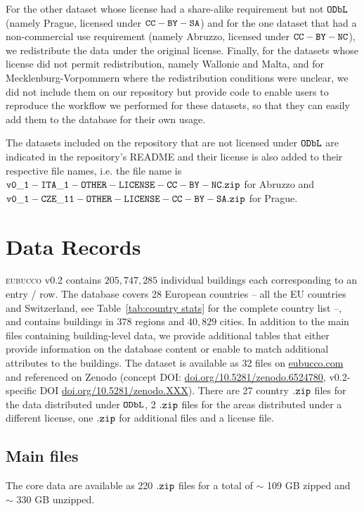 \documentclass[fleqn,10pt]{wlscirep}
\begin{document}
For the other dataset whose license had a share-alike requirement but not ${\tt ODbL}$ (namely Prague, licensed under ${\tt CC-BY-SA}$) and for the one dataset that had a non-commercial use requirement (namely Abruzzo, licensed under ${\tt CC-BY-NC}$), we redistribute the data under the original license. Finally, for the datasets whose license did not permit redistribution, namely Wallonie and Malta, and for Mecklenburg-Vorpommern where the redistribution conditions were unclear, we did not include them on our repository but provide code to enable users to reproduce the workflow we performed for these datasets, so that they can easily add them to the database for their own usage. 

The datasets included on the repository that are not licensed under ${\tt ODbL}$ are indicated in the repository's README and their license is also added to their respective file names, i.e. the file name is ${\tt v0\_1-ITA\_1-OTHER-LICENSE-CC-BY-NC.zip}$ for Abruzzo and ${\tt v0\_1-CZE\_11-OTHER-LICENSE-CC-BY-SA.zip}$ for Prague.


\section*{Data Records}

\textsc{eubucco} v0.2 \cite{eubucco_v0.2_2022_dataset} contains $205, 747, 285$ individual buildings each corresponding to an entry / row. The database covers 28 European countries -- all the EU countries and Switzerland, see Table~\ref{tab:country stats} for the complete country list --, and contains buildings in 378 regions and $40,829$ cities. In addition to the main files containing building-level data, we provide additional tables that either provide information on the database content or enable to match additional attributes to the buildings. The dataset is available as 32 files on \url{eubucco.com} and referenced on Zenodo (concept DOI: \url{doi.org/10.5281/zenodo.6524780}, v0.2-specific DOI \url{doi.org/10.5281/zenodo.XXX}). There are 27 country ${\tt .zip}$ files for the data distributed under ${\tt ODbL}$, 2 ${\tt .zip}$ files for the areas distributed under a different license, one ${\tt .zip}$ for additional files and a license file.

\subsection*{Main files}

The core data  are available as 220 $\tt{.zip}$ files for a total of $\sim$ 109 GB zipped and $\sim$ 330 GB unzipped.
\end{document}
